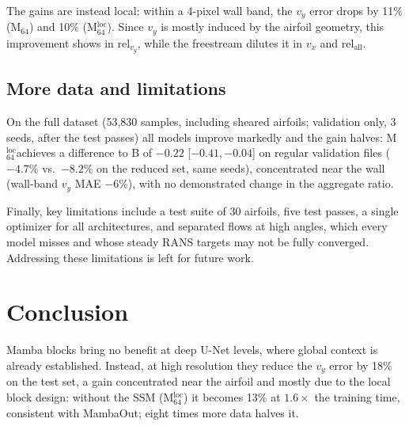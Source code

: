 \documentclass[conference]{IEEEtran}
\newcommand{\B}{B}                                  %
\newcommand{\M}[1]{M$_{#1}$}                        %
\newcommand{\Mloc}{M$^{\mathrm{loc}}_{64}$}         %
\newcommand{\Conv}{Conv$_{64}$}                     %
\newcommand{\relvy}{$\mathrm{rel}_{v_y}$}
\newcommand{\relall}{$\mathrm{rel}_{\mathrm{all}}$}
\newcommand{\ci}[2]{[$#1$,\,$#2$]}                  %
\begin{document}
The gains are instead local: within a 4-pixel wall band, the $v_y$ error drops
by 11\% (\M{64}) and 10\% (\Mloc). Since $v_y$ is mostly induced by the
airfoil geometry, this improvement shows in \relvy, while the freestream dilutes it in $v_x$ and
\relall.

\subsection{More data and limitations}
\label{sec:more}

On the full dataset (53,830 samples, including sheared airfoils; validation
only, 3 seeds, after the test passes) all models improve markedly and the gain
halves: \Mloc achieves a difference to \B{} of $-0.22$ \ci{-0.41}{-0.04} on regular validation files
($-4.7\%$ vs.\ $-8.2\%$ on the reduced set, same seeds), concentrated near the
wall (wall-band $v_y$ MAE  $-6\%$), with no demonstrated change in the aggregate ratio.

Finally, key limitations include a test suite of 30 airfoils, five test passes, a single
optimizer for all architectures, and separated flows at high angles, which
every model misses and whose steady RANS targets may not be fully converged. Addressing these limitations is left for future work.

\section{Conclusion}

Mamba blocks bring no benefit at deep U-Net levels, where global context is
already established. Instead, at high resolution they reduce the $v_y$ error by 18\% on
the test set, a gain concentrated near the airfoil and mostly due to the local
block design: without the SSM (\Mloc) it becomes 13\% at $1.6\times$ the training
time, consistent with MambaOut; eight times more data halves it. 




\end{document}

